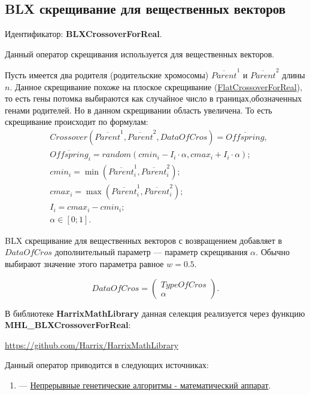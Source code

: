 \subsection{BLX скрещивание для вещественных векторов}\label{SetOfOperatorsAlgorithms:BLXCrossoverForReal}

Идентификатор: \textbf{BLXCrossoverForReal}.

Данный оператор скрещивания используется для вещественных векторов.

Пусть имеется два родителя (родительские хромосомы) $ \overline{Parent}^1 $ и $ \overline{Parent}^2$ длины $n$. Данное скрещивание похоже на плоское скрещивание (\hyperref[SetOfOperatorsAlgorithms:FlatCrossoverForReal]{FlatCrossoverForReal}), то есть гены потомка выбираются как случайное число в границах,обозначенных генами родителей. Но в данном скрещивании область увеличена. То есть скрещивание происходит по формулам:
\begin{align}
\label{SetOfOperatorsAlgorithms:eq:BLXCrossoverForReal}
&Crossover \left( \overline{Parent}^1, \overline{Parent}^2, DataOfCros\right)= \overline{Offspring}, \\
& \overline{Offspring}_i=random\left(cmin_i-I_i\cdot \alpha, cmax_i+I_i\cdot \alpha\right);\nonumber\\
& cmin_i = \min\left(\overline{Parent}^1_i, \overline{Parent}^2_i \right);\nonumber\\
& cmax_i = \max\left(\overline{Parent}^1_i, \overline{Parent}^2_i \right);\nonumber\\
& I_i = cmax_i-cmin_i;\nonumber\\
&\alpha\in \left[ 0; 1\right].\nonumber
\end{align}

BLX скрещивание для вещественных векторов с возвращением добавляет в $ DataOfCros $ дополнительный параметр --- параметр скрещивания $ \alpha $. Обычно выбирают значение этого параметра равное $ w=0.5 $.

\begin{equation}
DataOfCros=\left( \begin{array}{c} TypeOfCros \\ \alpha \end{array} \right).
\end{equation}

В библиотеке \textbf{HarrixMathLibrary} данная селекция реализуется через функцию \textbf{MHL\_BLXCrossoverForReal}:

\href{https://github.com/Harrix/HarrixMathLibrary}{https://github.com/Harrix/HarrixMathLibrary}

Данный оператор приводится в следующих источниках:

\begin{enumerate}
\item \cite{web:basegroup.ru:real_coded_ga} ---  \href{http://www.basegroup.ru/library/optimization/real_coded_ga/}{Непрерывные генетические алгоритмы - математический аппарат}.
\end{enumerate}